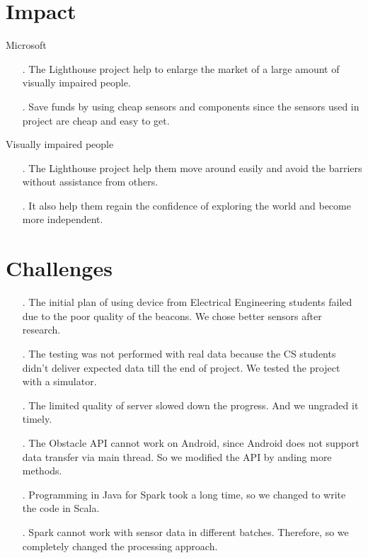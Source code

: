 \documentclass[prodmode,acmtosem]{acmsmall} %
\begin{document}
\section{Impact}
Microsoft
\begin{itemize}
\item[.] The Lighthouse project help to enlarge the market of a large amount of visually impaired people.\\
\item[.] Save funds by using cheap sensors and components since the sensors used in project are cheap and easy to get.
\end{itemize}
Visually impaired people
\begin{itemize}
\item[.] The Lighthouse project help them move around easily and avoid the barriers without assistance from others.\\
\item[.] It also help them regain the confidence of exploring the world and become more independent.
\end{itemize}

\section{Challenges}
\begin{itemize}
\item[.] The initial plan of using device from Electrical Engineering students failed due to the poor quality of the beacons. We chose better sensors after research.\\
\item[.] The testing was not performed with real data because the CS students didn't deliver expected data till the end of project. We tested the project with a simulator.\\
\item[.] The limited quality of server slowed down the progress. And we ungraded it timely.\\
\item[.] The Obstacle API cannot work on Android, since Android does not support data transfer via main thread. So we modified the API by anding more methods.\\
\item[.] Programming in Java for Spark took a long time, so we changed to write the code in Scala.\\
\item[.] Spark cannot work with sensor data in different batches. Therefore, so we completely changed the processing approach.\\
\end{itemize}
\end{document}
